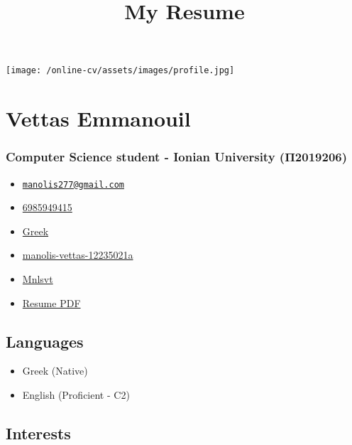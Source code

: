 \documentclass[english,]{article}
\title{My Resume}
\date{}
\providecommand{\tightlist}{%
  \setlength{\itemsep}{0pt}\setlength{\parskip}{0pt}}
\begin{document}
\maketitle

\texttt{[image: /online-cv/assets/images/profile.jpg]}

\hypertarget{vettas-emmanouil}{%
\section{Vettas Emmanouil}\label{vettas-emmanouil}}

\hypertarget{computer-science-student---ionian-university-ux3c02019206}{%
\subsubsection{Computer Science student - Ionian University
(Π2019206)}\label{computer-science-student---ionian-university-ux3c02019206}}

\begin{itemize}
\tightlist
\item
  \emph{}
  \href{mailto:manolis277@gmail.com}{\nolinkurl{manolis277@gmail.com}}
\item
  \emph{} \href{tel:6985949415}{6985949415}
\item
  \emph{} \href{}{Greek}
\item
  \emph{}
  \href{https://linkedin.com/in/manolis-vettas-12235021a}{manolis-vettas-12235021a}
\item
  \emph{} \href{http://github.com/Mnlsvt}{Mnlsvt}
\item
  \emph{}
  \href{https://docs.google.com/document/d/1bNU_hsyEOL6E0HbcMcEV27NNZYYOASvW_rJavJxNLKU/edit?usp=sharing}{Resume
  PDF}
\end{itemize}

\hypertarget{languages}{%
\subsection{Languages}\label{languages}}

\begin{itemize}
\tightlist
\item
  Greek {(Native)}
\item
  English {(Proficient - C2)}
\end{itemize}

\hypertarget{interests}{%
\subsection{Interests}\label{interests}}
\end{document}

